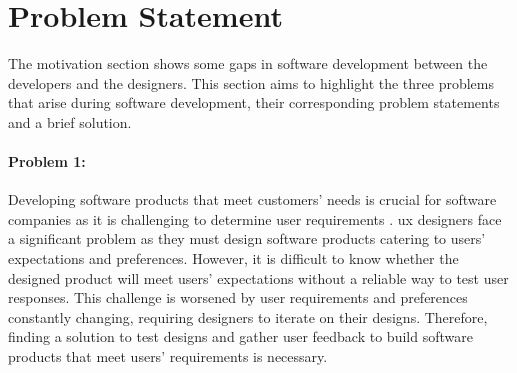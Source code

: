 \section{Problem Statement} %
\label{introduction:section:problems}
The motivation section shows some gaps in software development between the developers and the designers.
This section aims to highlight the three problems that arise during software development, their corresponding problem statements and a brief solution.

\paragraph{Problem 1:} 
Developing software products that meet customers' needs is crucial for software companies as it is challenging to determine user requirements \cite{article:experiments:lindgren}. 
\ac{ux} designers face a significant problem as they must design software products catering to users' expectations and preferences. 
However, it is difficult to know whether the designed product will meet users' expectations without a reliable way to test user responses. 
This challenge is worsened by user requirements and preferences constantly changing, requiring designers to iterate on their designs. 
Therefore, finding a solution to test designs and gather user feedback to build software products that meet users' requirements is necessary.



